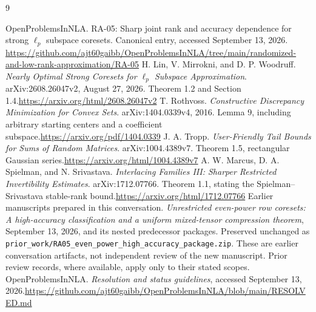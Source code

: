 \documentclass[11pt]{article}
\theoremstyle{remark}\newtheorem{remark}[theorem]{Remark}
\begin{document}
\clearpage
\begin{thebibliography}{9}\raggedright
{} OpenProblemsInNLA. RA-05: Sharp joint rank and accuracy dependence for strong $\ell_p$ subspace coresets. Canonical entry, accessed September 13, 2026.\newline
\url{https://github.com/ajt60gaibb/OpenProblemsInNLA/tree/main/randomized-and-low-rank-approximation/RA-05}
 H. Lin, V. Mirrokni, and D. P. Woodruff. \emph{Nearly Optimal Strong Coresets for $\ell_p$ Subspace Approximation}. arXiv:2608.26047v2, August 27, 2026. Theorem 1.2 and Section 1.4.\newline\url{https://arxiv.org/html/2608.26047v2}
 T. Rothvoss. \emph{Constructive Discrepancy Minimization for Convex Sets}. arXiv:1404.0339v4, 2016. Lemma 9, including arbitrary starting centers and a coefficient subspace.\newline\url{https://arxiv.org/pdf/1404.0339}
 J. A. Tropp. \emph{User-Friendly Tail Bounds for Sums of Random Matrices}. arXiv:1004.4389v7. Theorem 1.5, rectangular Gaussian series.\newline\url{https://arxiv.org/html/1004.4389v7}
 A. W. Marcus, D. A. Spielman, and N. Srivastava. \emph{Interlacing Families III: Sharper Restricted Invertibility Estimates}. arXiv:1712.07766. Theorem 1.1, stating the Spielman--Srivastava stable-rank bound.\newline\url{https://arxiv.org/html/1712.07766}
 Earlier manuscripts prepared in this conversation. \emph{Unrestricted even-power row coresets: A high-accuracy classification and a uniform mixed-tensor compression theorem}, September 13, 2026, and its nested predecessor packages. Preserved unchanged as \texttt{prior\_work/RA05\_even\_power\_high\_accuracy\_package.zip}. These are earlier conversation artifacts, not independent review of the new manuscript. Prior review records, where available, apply only to their stated scopes.
 OpenProblemsInNLA. \emph{Resolution and status guidelines}, accessed September 13, 2026.\newline\url{https://github.com/ajt60gaibb/OpenProblemsInNLA/blob/main/RESOLVED.md}
\end{thebibliography}
\end{document}

